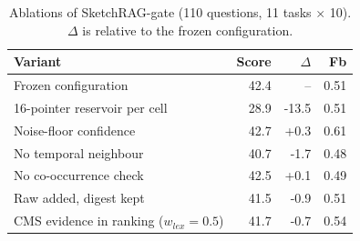 \begin{table}[t]
\centering
\caption{Ablations of SketchRAG-gate (110 questions, 11 tasks $\times$ 10). $\Delta$ is relative to the frozen configuration.}
\label{tab:ablate}
\setlength{\tabcolsep}{4pt}
\begin{tabular}{lrrr}
\toprule
Variant & Score & $\Delta$ & Fb \\
\midrule
Frozen configuration & 42.4 & -- & 0.51 \\
16-pointer reservoir per cell & 28.9 & -13.5 & 0.51 \\
Noise-floor confidence & 42.7 & +0.3 & 0.61 \\
No temporal neighbour & 40.7 & -1.7 & 0.48 \\
No co-occurrence check & 42.5 & +0.1 & 0.49 \\
Raw added, digest kept & 41.5 & -0.9 & 0.51 \\
CMS evidence in ranking ($w_{lex}{=}0.5$) & 41.7 & -0.7 & 0.54 \\
\bottomrule
\end{tabular}
\end{table}
